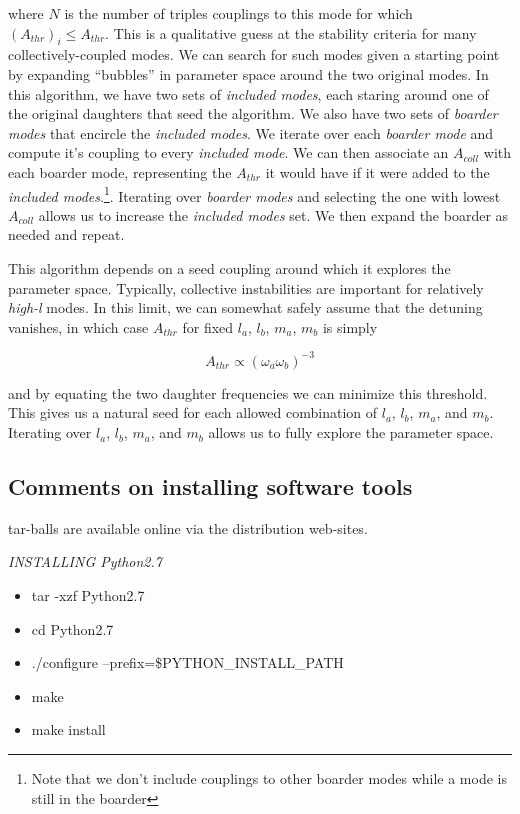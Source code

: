 where $N$ is the number of triples couplings to this mode for which $\left(A_{thr}\right)_i\leq A_{thr}$. This is a qualitative guess at the stability criteria for many collectively-coupled modes. We can search for such modes given a starting point by expanding ``bubbles'' in parameter space around the two original modes. In this algorithm, we have two sets of \emph{included modes}, each staring around one of the original daughters that seed the algorithm. We also have two sets of \emph{boarder modes} that encircle the \emph{included modes}. We iterate over each \emph{boarder mode} and compute it's coupling to every \emph{included mode}. We can then associate an $A_{coll}$ with each boarder mode, representing the $A_{thr}$ it would have if it were added to the \emph{included modes}.\footnote{Note that we don't include couplings to other boarder modes while a mode is still in the boarder}. Iterating over \emph{boarder modes} and selecting the one with lowest $A_{coll}$ allows us to increase the \emph{included modes} set. We then expand the boarder as needed and repeat.

This algorithm depends on a seed coupling around which it explores the parameter space. Typically, collective instabilities are important for relatively \emph{high-l} modes. In this limit, we can somewhat safely assume that the detuning vanishes, in which case $A_{thr}$ for fixed $l_a$, $l_b$, $m_a$, $m_b$ is simply

\begin{equation}
A_{thr} \propto \left(\omega_a \omega_b\right)^{-3}
\end{equation}

and by equating the two daughter frequencies we can minimize this threshold. This gives us a natural seed for each allowed combination of $l_a$, $l_b$, $m_a$, and $m_b$. Iterating over $l_a$, $l_b$, $m_a$, and $m_b$ allows us to fully explore the parameter space.

\subsection*{Comments on installing software tools}

tar-balls are available online via the distribution web-sites. 

\emph{INSTALLING Python2.7}
\begin{itemize}
  \item{tar -xzf Python2.7}
  \item{cd Python2.7}
  \item{./configure --prefix=\$PYTHON\_INSTALL\_PATH}
  \item{make}
  \item{make install}
\end{itemize}

